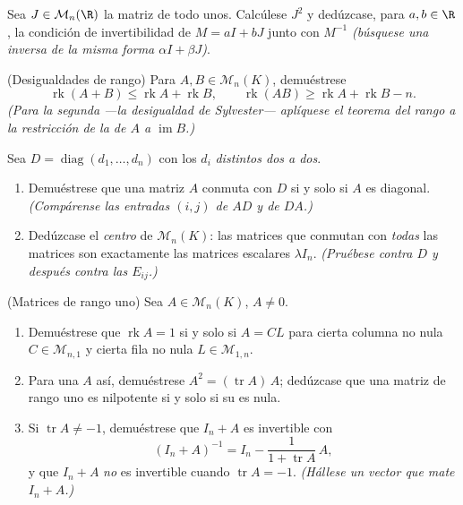 \begin{exercise}[$\star\star\star$]\label{exo:b1:matrices:9}
Sea $J \in \mathcal{M}_n(\R)$ la matriz de todo unos. Calcúlese
$J^2$ y dedúzcase, para $a, b \in \R$, la condición de
invertibilidad de $M = aI + bJ$ junto con $M^{-1}$ \emph{(búsquese
una inversa de la misma forma $\alpha I + \beta J$)}.
\end{exercise}

\begin{exercise}[$\star\star\star$]\label{exo:b1:matrices:10}
(Desigualdades de rango) Para $A, B \in \mathcal{M}_n(K)$, demuéstrese
\[
\operatorname{rk}(A + B) \leq \operatorname{rk} A +
\operatorname{rk} B,
\qquad
\operatorname{rk}(AB) \geq \operatorname{rk} A + \operatorname{rk}
B - n .
\]
\emph{(Para la segunda ---la desigualdad de Sylvester--- aplíquese el
teorema del rango a la restricción de la  de $A$ a
$\operatorname{im} B$.)}
\end{exercise}

\begin{exercise}[$\star\star$]\label{exo:b1:matrices:11}
Sea $D = \operatorname{diag}(d_1, \dots, d_n)$ con los $d_i$
\emph{distintos dos a dos}.
\begin{enumerate}
  \item Demuéstrese que una matriz $A$ conmuta con $D$ si y solo si
        $A$ es diagonal. \emph{(Compárense las entradas $(i,j)$ de
        $AD$ y de $DA$.)}
  \item Dedúzcase el \emph{centro} de $\mathcal{M}_n(K)$: las
        matrices que conmutan con \emph{todas} las matrices son
        exactamente las matrices escalares $\lambda I_n$.
        \emph{(Pruébese contra $D$ y después contra las $E_{ij}$.)}
\end{enumerate}
\end{exercise}

\begin{exercise}[$\star\star\star$]\label{exo:b1:matrices:12}
(Matrices de rango uno) Sea $A \in \mathcal{M}_n(K)$, $A \neq 0$.
\begin{enumerate}
  \item Demuéstrese que $\operatorname{rk} A = 1$ si y solo si
        $A = CL$ para cierta columna no nula
        $C \in \mathcal{M}_{n,1}$ y cierta fila no nula
        $L \in \mathcal{M}_{1,n}$.
  \item Para una $A$ así, demuéstrese $A^2 = (\operatorname{tr} A)\,A$;
        dedúzcase que una matriz de rango uno es nilpotente si y solo
        si su  es nula.
  \item Si $\operatorname{tr} A \neq -1$, demuéstrese que $I_n + A$
        es invertible con
        \[
        (I_n + A)^{-1} = I_n - \frac{1}{1 + \operatorname{tr}
        A}\,A ,
        \]
        y que $I_n + A$ \emph{no} es invertible cuando
        $\operatorname{tr} A = -1$. \emph{(Hállese un vector que
        mate $I_n + A$.)}
\end{enumerate}
\end{exercise}


